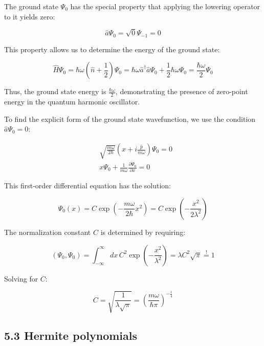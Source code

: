 \documentclass[italian]{HKNdocument}
\begin{document}
The ground state $\Psi_0$ has the special property that applying the lowering operator to it yields zero:

\begin{equation*}
\hat{a}\Psi_0 = \sqrt{0}\Psi_{-1} = 0 \tag{5.38}
\end{equation*}

This property allows us to determine the energy of the ground state:

\begin{equation*}
\hat{H}\Psi_0 = \hbar\omega\left(\hat{n}+\frac{1}{2}\right)\Psi_0 = \hbar\omega\hat{a}^\dagger\hat{a}\Psi_0 + \frac{1}{2}\hbar\omega\Psi_0 = \frac{\hbar\omega}{2}\Psi_0 \tag{5.39}
\end{equation*}

Thus, the ground state energy is $\frac{\hbar\omega}{2}$, demonstrating the presence of zero-point energy in the quantum harmonic oscillator.

To find the explicit form of the ground state wavefunction, we use the condition $\hat{a}\Psi_0 = 0$:

\begin{align*}
&\sqrt{\frac{m\omega}{2\hbar}}\left(x + i\frac{\hat{p}}{m\omega}\right)\Psi_0 = 0 \tag{5.40} \\
&x\Psi_0 + \frac{1}{m\omega}\frac{\partial\Psi_0}{\partial x} = 0
\end{align*}

This first-order differential equation has the solution:

\begin{equation*}
\Psi_0(x) = C\exp\left(-\frac{m\omega}{2\hbar}x^2\right) = C\exp\left(-\frac{x^2}{2\lambda^2}\right) \tag{5.41}
\end{equation*}

The normalization constant $C$ is determined by requiring:

\begin{equation*}
(\Psi_0, \Psi_0) = \int_{-\infty}^{\infty}dx\,C^2\exp\left(-\frac{x^2}{\lambda^2}\right) = \lambda C^2\sqrt{\pi} \stackrel{!}{=} 1 \tag{5.42}
\end{equation*}

Solving for $C$:

\begin{equation*}
C = \sqrt{\frac{1}{\lambda\sqrt{\pi}}} = \left(\frac{m\omega}{\hbar\pi}\right)^{-\frac{1}{4}} \tag{5.43}
\end{equation*}

\subsection*{5.3 Hermite polynomials}
\end{document}
